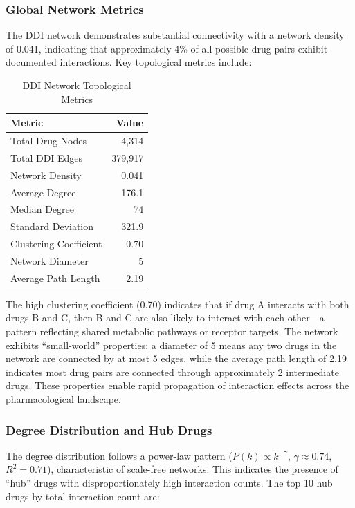 \documentclass[11pt,a4paper]{article}
\begin{document}
\subsubsection*{Global Network Metrics}

The DDI network demonstrates substantial connectivity with a network density of 0.041, indicating that approximately 4\% of all possible drug pairs exhibit documented interactions. Key topological metrics include:

\begin{table}[H]
\centering
\caption{DDI Network Topological Metrics}
\label{tab:network_metrics}
\begin{tabular}{lr}
\toprule
\textbf{Metric} & \textbf{Value} \\
\midrule
Total Drug Nodes & 4,314 \\
Total DDI Edges & 379,917 \\
Network Density & 0.041 \\
Average Degree & 176.1 \\
Median Degree & 74 \\
Standard Deviation & 321.9 \\
Clustering Coefficient & 0.70 \\
Network Diameter & 5 \\
Average Path Length & 2.19 \\
\bottomrule
\end{tabular}
\end{table}

The high clustering coefficient (0.70) indicates that if drug A interacts with both drugs B and C, then B and C are also likely to interact with each other---a pattern reflecting shared metabolic pathways or receptor targets. The network exhibits ``small-world'' properties: a diameter of 5 means any two drugs in the network are connected by at most 5 edges, while the average path length of 2.19 indicates most drug pairs are connected through approximately 2 intermediate drugs. These properties enable rapid propagation of interaction effects across the pharmacological landscape.

\subsubsection*{Degree Distribution and Hub Drugs}

The degree distribution follows a power-law pattern ($P(k) \propto k^{-\gamma}$, $\gamma \approx 0.74$, $R^2 = 0.71$), characteristic of scale-free networks. This indicates the presence of ``hub'' drugs with disproportionately high interaction counts. The top 10 hub drugs by total interaction count are:
\end{document}
